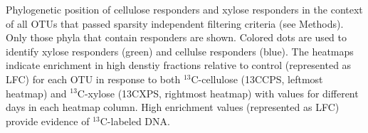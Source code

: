Phylogenetic position of cellulose responders and xylose responders in the context of all OTUs that passed 
sparsity independent filtering criteria (see Methods). Only those phyla that contain responders are shown.
Colored dots are used to identify xylose responders (green) and cellulse
responders (blue). The heatmaps indicate enrichment in high denstiy fractions
relative to control (represented as LFC) for each OTU in response to both
$^{13}$C-cellulose (13CCPS, leftmost heatmap) and $^{13}$C-xylose
(13CXPS, rightmost heatmap) with values for different days in each heatmap
column. High enrichment values (represented as LFC) provide evidence of $^{13}$C-labeled DNA.  

